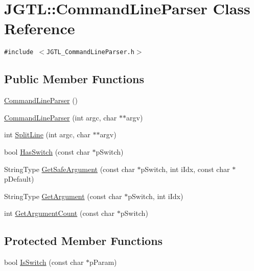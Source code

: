 \hypertarget{class_j_g_t_l_1_1_command_line_parser}{
\section{JGTL::Command\-Line\-Parser Class Reference}
\label{class_j_g_t_l_1_1_command_line_parser}
}
{\tt \#include $<$JGTL\_\-Command\-Line\-Parser.h$>$}

\subsection*{Public Member Functions}
\begin{CompactItemize}
\item 
\hyperlink{class_j_g_t_l_1_1_command_line_parser_473d8a614f8409897c4d65794f92a957}{Command\-Line\-Parser} ()
\item 
\hyperlink{class_j_g_t_l_1_1_command_line_parser_eb3da99a9a6a6dbe1463e4dfb50be1f3}{Command\-Line\-Parser} (int argc, char $\ast$$\ast$argv)
\item 
int \hyperlink{class_j_g_t_l_1_1_command_line_parser_304f2f63261595edfe8b0f0e231c093c}{Split\-Line} (int argc, char $\ast$$\ast$argv)
\item 
bool \hyperlink{class_j_g_t_l_1_1_command_line_parser_0518e511aa9b1adeff0199cb1633a86b}{Has\-Switch} (const char $\ast$p\-Switch)
\item 
String\-Type \hyperlink{class_j_g_t_l_1_1_command_line_parser_47b94ca90fb66f7debd7f03b45269540}{Get\-Safe\-Argument} (const char $\ast$p\-Switch, int i\-Idx, const char $\ast$p\-Default)
\item 
String\-Type \hyperlink{class_j_g_t_l_1_1_command_line_parser_cf9a006afb6a7e4c2ffb40bba6e63da2}{Get\-Argument} (const char $\ast$p\-Switch, int i\-Idx)
\item 
int \hyperlink{class_j_g_t_l_1_1_command_line_parser_c5e991d165d237f09de0d71b073d1481}{Get\-Argument\-Count} (const char $\ast$p\-Switch)
\end{CompactItemize}
\subsection*{Protected Member Functions}
\begin{CompactItemize}
\item 
bool \hyperlink{class_j_g_t_l_1_1_command_line_parser_60a893fdd6b76a0da22d1790d221fcb0}{Is\-Switch} (const char $\ast$p\-Param)
\end{CompactItemize}


